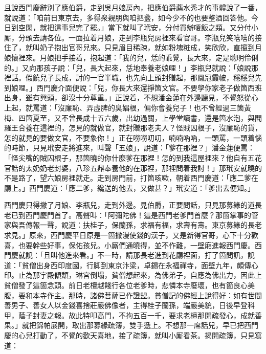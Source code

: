 且說西門慶辭別了應伯爵，走到吳月娘房內，把應伯爵薦水秀才的事體說了一番，就說道：「咱前日東京去，多得衆親朋與咱把盞，如今少不的也要整酒回答他。今日到空閑，就把這事兒完了罷。」當下就叫了玳安，分付買辦嗄飯之類。又分付小厮，分頭去請各位。一面拉着月娘，走到李瓶兒房裡來看官哥。李瓶兒笑嘻嘻的接住了，就叫奶子抱出官哥兒來。只見眉目稀疎，就如粉塊粧成，笑欣欣，直攛到月娘懷裡來。月娘把手接着，抱起道：「我的兒，恁的乖覺，長大來，定是聰明伶俐的。」又向那孩子說：「兒，長大起來，恁地奉養老娘哩！」李瓶兒就說：「娘說那裡話。假饒兒子長成，討的一官半職，也先向上頭封贈起，那鳳冠霞帔，穩穩兒先到娘哩。」{}西門慶介面便說：「兒，你長大來還掙箇文官。不要學你家老子做箇西班出身，雖有興頭，卻沒十分尊重。」{}正說着，不想潘金蓮在外邊聽見，不覺怒從心上起，{}就罵道：「沒廉恥、弄虛脾的臭娼根，偏你會養兒子！也不曾經過三箇黃梅、四箇夏至，又不曾長成十五六歲，出幼過關，上學堂讀書，還是箇水泡，與閻羅王合養在這裡的，怎見的就做官，就封贈那老夫人？怪賊囚根子，沒廉恥的貨，怎的就見的要做文官，不要象你！」{}正在嘮嘮叨叨，喃喃吶吶，一頭罵，一頭着惱的時節，只見玳安走將進來，叫聲「五娘」，說道：「爹在那裡？」潘金蓮便罵：「怪尖嘴的賊囚根子，那箇曉的你什麼爹在那裡！怎的到我這屋裡來？他自有五花官誥的太奶奶老封婆，八珍五鼎奉養他的在那裡，{}那裡問着我討！」那玳安就曉的不是路了，望六娘房裡就走。{}走到房門前，打箇咳嗽，朝着西門慶道：「應二爹在廳上。」西門慶道：「應二爹，纔送的他去，又做甚？」玳安道：「爹出去便知。」

西門慶只得撇了月娘、李瓶兒，走到外邊。見伯爵，正要問話，只見那募緣的道長老已到西門慶門首了。高聲叫：「阿彌陀佛！這是西門老爹門首麼？那箇掌事的管家與吾傳報一聲，說道：扶桂子，保蘭孫，求福有福，求壽有壽。{}東京募緣的長老求見。」原來，西門慶平日原是一箇撒漫使錢的漢子，又是新得官哥，心下十分歡喜，也要幹些好事，保佑孩兒。小厮們通曉得，並不作難，一壁廂進報西門慶。西門慶就說：「且叫他進來看。」不一時，請那長老進到花廳裡面，打了箇問訊，說道：「貧僧出身西印度國，行脚到東京汴梁，卓錫在永福禪寺，面壁九年，頗傳心印。止為那宇殿傾頹，琳宮倒塌，貧僧想起來，為佛弟子，自應為佛出力，因此上貧僧發了這箇念頭。前日老檀越餞行各位老爹時，悲憐本寺廢壞，也有箇良心美腹，要和本寺作主。那時，諸佛菩薩已作證盟。貧僧記的佛經上說得好：如有世間善男子、善女人以金錢喜捨莊嚴佛像者，主得桂子蘭孫，端嚴美貌，日後早登科甲，蔭子封妻之報。故此特叩高門，不拘五百一千，要求老檀那開疏發心，成就善果。」就把錦帕展開，取出那募緣疏簿，雙手遞上。不想那一席話兒，早已把西門慶的心兒打動了，不覺的歡天喜地，{}接了疏簿，就叫小厮看茶。揭開疏簿，只見寫道：

